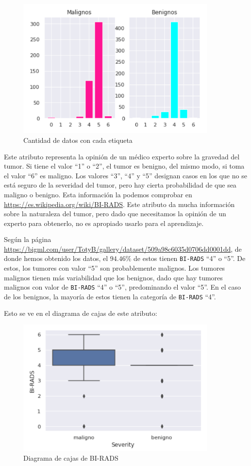 \documentclass[a4]{article}
\begin{document}
\begin{figure}[H]
  \centering
  \caption{Cantidad de datos con cada etiqueta}
  \includegraphics[width=100mm]{imagenes/bi_rads}
\end{figure}

Este atributo representa la opinión de un médico experto sobre la gravedad del tumor. Si tiene el valor ``1'' o ``2'', el tumor es benigno, del mismo modo, si toma el valor ``6'' es maligno. Los valores ``3'', ``4'' y ``5'' designan casos en los que no se está seguro de la severidad del tumor, pero hay cierta probabilidad de que sea maligno o benigno. Esta información la podemos comprobar en \href{https://es.wikipedia.org/wiki/BI-RADS}{https://es.wikipedia.org/wiki/BI-RADS}. Este atributo da mucha información sobre la naturaleza del tumor, pero dado que necesitamos la opinión de un experto para obtenerlo, no es apropiado usarlo para el aprendizaje.

Según la página \href{https://bigml.com/user/TotyB/gallery/dataset/509a98c6035d0706dd0001dd}{https://bigml.com/user/TotyB/gallery/dataset/509a98c6035d0706dd0001dd}, de donde hemos obtenido los datos, el $94.46\%$ de estos tienen \texttt{BI-RADS} ``4'' o ``5''. De estos, los tumores con valor ``5'' son probablemente malignos. Los tumores malignos tienen más variabilidad que los benignos, dado que hay tumores malignos con valor de \texttt{BI-RADS} ``4'' o ``5'', predominando el valor ``5''. En el caso de los benignos, la mayoría de estos tienen la categoría de \texttt{BI-RADS} ``4''.

Esto se ve en el diagrama de cajas de este atributo:

\begin{figure}[H]
  \centering
  \caption{Diagrama de cajas de BI-RADS}
  \includegraphics[width=100mm]{imagenes/bp_birads}
\end{figure}
\end{document}
